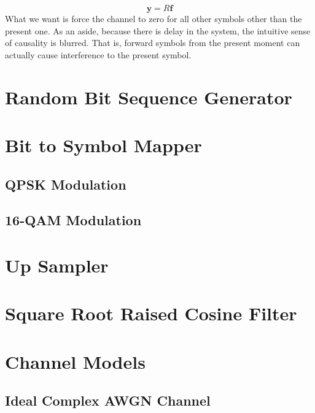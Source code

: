\documentclass[]{article}
\begin{document}
\begin{equation}
\label{eq:equalizerMatrix}
\mathbf{y} = R\mathbf{f}
\end{equation}
What we want is force the channel to zero for all other symbols other than the present one.  As an aside, because there is delay in the system, the intuitive sense of causality is blurred. That is, forward symbols from the present moment can actually cause interference to the present symbol. 

\section{Random Bit Sequence Generator}
\label{app:random_bit_generator}


\section{Bit to Symbol Mapper}
\label{app:bittosym}

\subsection{QPSK Modulation}
\label{app:qpsk_mod}


\subsection{16-QAM Modulation}
\label{app:qam_16_mod}


\section{Up Sampler}
\label{app:impulse_train}


\section{Square Root Raised Cosine Filter}
\label{app:sqrt_raised_cosine}


\section{Channel Models}
\subsection{Ideal Complex AWGN Channel}
\label{app:awgn_channel}

\end{document}
